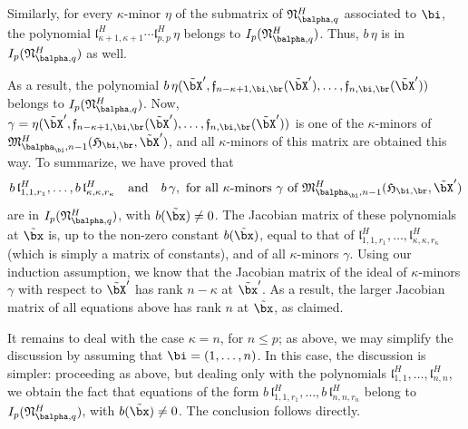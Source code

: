 \documentclass[12pt]{article}
\begin{document}
Similarly, for every $\kappa$-minor $\eta$ of the submatrix of
$\mathfrak{N}^H_{\balpha,q}$ associated to $\bi$, the
polynomial  $\mathfrak{l}^H_{\kappa+1,\kappa+1}\cdots \mathfrak{l}^H_{p,p}\, \eta$ belongs to
$I_p(\mathfrak{N}^H_{\balpha,q})$. Thus, $b \,\eta$ is in $I_p(\mathfrak{N}^H_{\balpha,q})$
as well.

As a result, the polynomial $b\, \eta(\tilde\bX',\mathfrak{f}_{n-\kappa+1,\bi,\br}(\tilde\bX'),\dots,\mathfrak{f}_{n,\bi,\br}(\tilde\bX'))$
belongs to $I_p(\mathfrak{N}^H_{\balpha,q})$. Now, 
$\gamma=\eta(\tilde\bX',\mathfrak{f}_{n-\kappa+1,\bi,\br}(\tilde\bX'),\dots,\mathfrak{f}_{n,\bi,\br}(\tilde\bX'))$
is one of the $\kappa$-minors of
$\mathfrak{M}^H_{\balpha_\bi,n-1}(\mathfrak{H}_{\bi,\br},\tilde\bX')$,
and all $\kappa$-minors of this matrix are obtained this way.
To summarize, we have proved that 
$$b\, \mathfrak{l}^H_{1,1,r_1},\dots,b\,
\mathfrak{l}^H_{\kappa,\kappa,r_\kappa} \quad\text{and}\quad b\, \gamma,
\text{~for all $\kappa$-minors $\gamma$ of
  $\mathfrak{M}^H_{\balpha_\bi,n-1}(\mathfrak{H}_{\bi,\br},\tilde\bX')$}$$
are in $I_p(\mathfrak{N}^H_{\balpha,q})$, with $b(\tilde\bx) \ne
0$. The Jacobian matrix of these polynomials at $\tilde\bx$ is, up to
the non-zero constant $b(\tilde\bx)$, equal to that of
$\mathfrak{l}^H_{1,1,r_1},\dots,
\mathfrak{l}^H_{\kappa,\kappa,r_\kappa}$ (which is simply 
a matrix of constants), and of all $\kappa$-minors
$\gamma$. Using our induction assumption, we know that the Jacobian
matrix of the ideal of $\kappa$-minors $\gamma$ with respect to
$\tilde\bX'$ has rank $n-\kappa$ at $\tilde\bx'$. As a result, 
the larger Jacobian matrix of all equations above 
has rank $n$ at $\tilde\bx$, as claimed.

It remains to deal with the case $\kappa=n$, for $n \le p$; as above,
we may simplify the discussion by assuming that $\bi=(1,\dots,n)$. In
this case, the discussion is simpler: proceeding as above, but dealing
only with the polynomials
$\mathfrak{l}^H_{1,1},\dots,\mathfrak{l}^H_{n,n}$, we obtain the fact
that equations of the form $b\, \mathfrak{l}^H_{1,1,r_1},\dots,b\,
\mathfrak{l}^H_{n,n,r_n}$ belong to $I_p(\mathfrak{N}^H_{\balpha,q})$,
with $b(\tilde\bx) \ne 0$. The conclusion follows directly.
\end{document}
